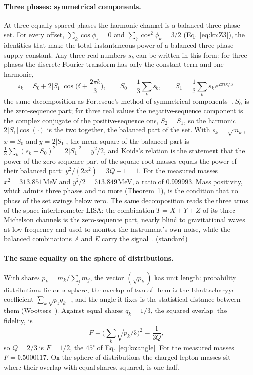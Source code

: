 \paragraph{Three phases: symmetrical components.} At three equally spaced phases the harmonic channel is a balanced three-phase set. For every
offset, $\sum_k\cos\phi_k=0$ and $\sum_k\cos^2\phi_k=3/2$ (Eq.~\eqref{eq:ko:Z3}), the identities that make the total instantaneous power of a balanced
three-phase supply constant. \derived{} Any three real numbers $s_k$ can be written in this form: for three phases the discrete Fourier transform has
only the constant term and one harmonic,
\begin{equation}
s_k=S_0+2|S_1|\cos\!\Big(\delta+\frac{2\pi k}{3}\Big),\qquad S_0=\frac13\sum_ks_k,\qquad S_1=\frac13\sum_ks_k\,e^{2\pi ik/3},\label{eq:ko:seq}
\end{equation}
the same decomposition as Fortescue's method of symmetrical components~\cite{Fortescue1918}. $S_0$ is the zero-sequence part; for three real
values the negative-sequence component is the complex conjugate of the positive-sequence one, $S_2=\overline{S_1}$, so the harmonic
$2|S_1|\cos(\cdot)$ is the two together, the balanced part of the set. \derived{} With $s_k=\sqrt{m_k}$, $x=S_0$ and $y=2|S_1|$, the mean square of
the balanced part is $\tfrac13\sum_k(s_k-S_0)^2=2|S_1|^2=y^2/2$, and Koide's relation is the statement that the power of the zero-sequence part of
the square-root masses equals the power of their balanced part: $y^2/(2x^2)=3Q-1=1$. For the measured masses
$x^2=313.851$\,MeV and $y^2/2=313.849$\,MeV, a ratio of $0.999993$. \calc{} Mass positivity, which admits three phases and no more (Theorem~1), is
the condition that no phase of the set swings below zero. \derived
The same decomposition reads the three arms of the space interferometer LISA: the combination $T=X+Y+Z$ of its three Michelson channels is the
zero-sequence part, nearly blind to gravitational waves at low frequency and used to monitor the instrument's own noise, while the balanced
combinations $A$ and $E$ carry the signal~\cite{Prince2002}. \derived{} (standard)

\paragraph{The same equality on the sphere of distributions.} With shares $p_k=m_k/\sum_jm_j$, the vector $(\sqrt{p_k})$ has unit length:
probability distributions lie on a sphere, the overlap of two of them is the Bhattacharyya coefficient $\sum_k\sqrt{p_kq_k}$~\cite{Bhattacharyya1943},
and the angle it fixes is the statistical distance between them (Wootters~\cite{Wootters1981}). \derived{} Against equal shares $q_k=1/3$, the
squared overlap, the fidelity, is
\begin{equation}
F=\Big(\sum_k\sqrt{p_k/3}\Big)^2=\frac{1}{3Q},\label{eq:ko:fid}
\end{equation}
so $Q=2/3$ is $F=1/2$, the $45^\circ$ of Eq.~\eqref{eq:ko:angle}. For the measured masses $F=0.5000017$. \calc{} On the sphere of distributions
the charged-lepton masses sit where their overlap with equal shares, squared, is one half. \interp

